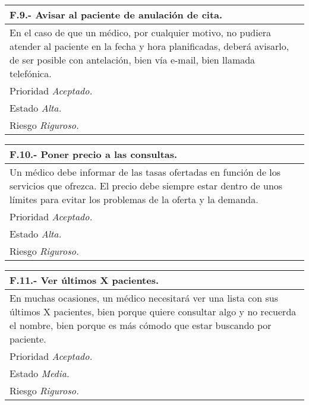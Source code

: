 \documentclass[a4paper,oneside,11pt]{book}
\begin{document}
\begin{center}
\begin{tabulary}{15cm}{|L|}
	\hline
		\bf{F.9.- Avisar al paciente de anulación de cita.} \\
	\hline
		En el caso de que un médico, por cualquier motivo, no pudiera atender al paciente en la fecha y hora planificadas, deberá avisarlo, de ser posible con antelación, bien vía e-mail, bien llamada telefónica. \\
	\hline
		Prioridad \textit{Aceptado.} \\
	\hline
		Estado \textit{Alta.} \\
	\hline
		Riesgo \textit{Riguroso.} \\
	\hline
\end{tabulary}
\end{center}

\begin{center}
\begin{tabulary}{15cm}{|L|}
	\hline
		\bf{F.10.- Poner precio a las consultas.} \\
	\hline
		Un médico debe informar de las tasas ofertadas en función de los servicios que ofrezca. El precio debe siempre estar dentro de unos límites para evitar los problemas de la oferta y la demanda. \\
	\hline
		Prioridad \textit{Aceptado.} \\
	\hline
		Estado \textit{Alta.} \\
	\hline
		Riesgo \textit{Riguroso.} \\
	\hline
\end{tabulary}
\end{center}

\begin{center}
\begin{tabulary}{15cm}{|L|}
	\hline
		\bf{F.11.- Ver últimos X pacientes.} \\
	\hline
		En muchas ocasiones, un médico necesitará ver una lista con sus últimos X pacientes, bien porque quiere consultar algo y no recuerda el nombre, bien porque es más cómodo que estar buscando por paciente. \\
	\hline
		Prioridad \textit{Aceptado.} \\
	\hline
		Estado \textit{Media.} \\
	\hline
		Riesgo \textit{Riguroso.} \\
	\hline
\end{tabulary}
\end{center}
\end{document}
